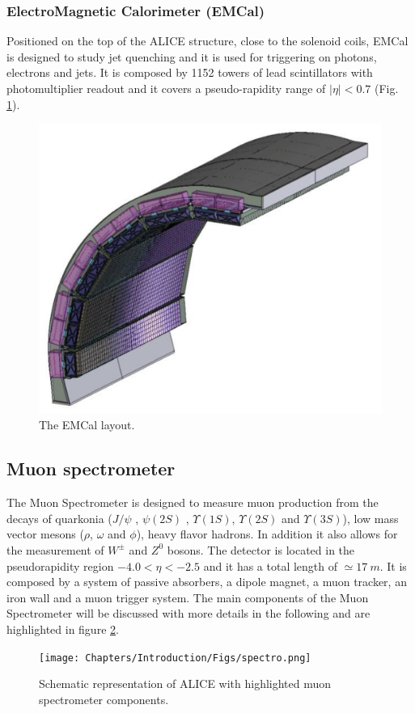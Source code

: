 \subsubsection{ElectroMagnetic Calorimeter (EMCal)}
Positioned on the top of the ALICE structure, close to the solenoid coils, EMCal is designed to study jet quenching and it is used for triggering on photons, electrons and jets.
It is composed by 1152 towers of lead scintillators with photomultiplier readout and it covers a pseudo-rapidity range of $|\eta| < 0.7$ (Fig. \ref{fig:EMCAL}).

\begin{figure}[!h]
\begin{center}
\includegraphics[width=0.5\linewidth]{Chapters/Introduction/Figs/emcal.png}
\caption{The EMCal layout.}
\label{fig:EMCAL}
\end{center}
\end{figure}

\subsection{Muon spectrometer}
The Muon Spectrometer is designed to measure muon production from the decays of quarkonia ($J/\psi$ , $\psi(2S)$ , $\Upsilon(1S)$, $\Upsilon(2S)$ and $\Upsilon(3S)$), low mass vector mesons ($\rho$, $\omega$ and $\phi$), heavy flavor hadrons.
In addition it also allows for the measurement of $W^\pm$ and $Z^0$ bosons. 
The detector is located in the pseudorapidity region $−4.0 < \eta < −2.5$ and it has a total length of $\simeq 17\ m$. 
It is composed by a system of passive absorbers, a dipole magnet, a muon tracker, an iron wall and a muon trigger system. 
The main components of the Muon Spectrometer will be discussed with more details in the following and are highlighted in figure \ref{fig:spectro}.

\begin{figure}[!h]
\begin{center}
\texttt{[image: Chapters/Introduction/Figs/spectro.png]}
\caption{Schematic representation of ALICE with highlighted muon spectrometer components.}
\label{fig:spectro}
\end{center}
\end{figure}

